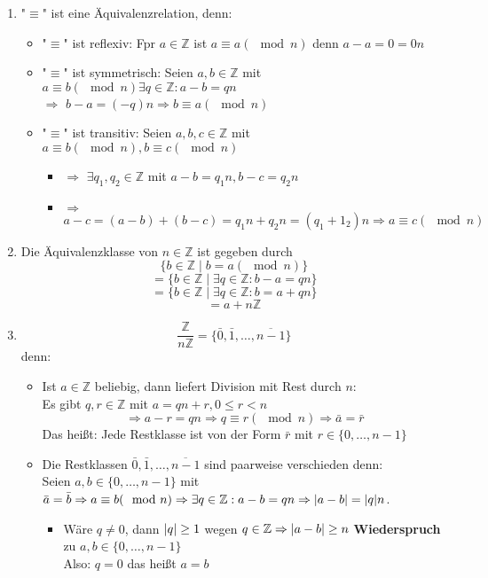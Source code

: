 \documentclass[a4paper]{scrartcl}
\DeclarePairedDelimiter\abs{\lvert}{\rvert}%
\begin{document}
\begin{enumerate}
\item "$\equiv$" ist eine Äquivalenzrelation, denn:
\begin{itemize}
\item "$\equiv$" ist reflexiv: Fpr $a\in\mathbb{Z}$ ist $a\equiv a(\mod n)$ denn $a - a = 0 = 0 n$
\item "$\equiv$" ist symmetrisch: Seien $a,b\in\mathbb{Z}$ mit $a\equiv b(\mod n) \exists q\in\mathbb{Z}:a - b = q n$ \\
           $\Rightarrow$ $b - a = (-q) n \Rightarrow b \equiv a(\mod n)$
\item "$\equiv$" ist transitiv: Seien $a,b,c\in\mathbb{Z}$ mit $a\equiv b(\mod n), b\equiv c(\mod n)$
\begin{itemize}
\item $\Rightarrow$ $\exists q_1,q_2 \in\mathbb{Z}$ mit $a - b = q_1 n, b - c = q_2 n$
\item $\Rightarrow$ $a - c = (a - b) + (b - c) = q_1 n + q_2 n = (q_1 + 1_2) n \Rightarrow a \equiv c(\mod n)$
\end{itemize}
\end{itemize}
\item Die Äquivalenzklasse von $n\in\mathbb{Z}$ ist gegeben durch
\[\{b\in\mathbb{Z} \mid b = a(\mod n)\}\]
\[= \{b\in\mathbb{Z} \mid \exists q\in\mathbb{Z}:b - a = qn\}\]
\[= \{b\in\mathbb{Z} \mid \exists q\in\mathbb{Z}:b = a + q n\}\]
\[= a + n\mathbb{Z} \]
\item \[\frac{\mathbb{Z}}{n\mathbb{Z}} = \{\bar 0, \bar 1, \ldots, \overline{n - 1}\}\]
         denn:
\begin{itemize}
\item Ist $a\in\mathbb{Z}$ beliebig, dann liefert Division mit Rest durch $n$: \\
           Es gibt $q,r\in\mathbb{Z}$ mit $a = q n + r,0\leq r < n$
           \[\Rightarrow a - r = q n \Rightarrow q \equiv r(\mod n) \Rightarrow \bar a = \bar r\]
           Das heißt: Jede Restklasse ist von der Form $\bar r$ mit $r\in \{0,\ldots,n - 1\}$ \\
\item Die Restklassen $\bar 0, \bar 1, \ldots, \overline{n - 1}$ sind paarweise verschieden denn: \\
           Seien $a,b\in\{0,\ldots,n - 1\}$ mit $\bar a = \bar b \Rightarrow a \equiv b(\mod n) \Rightarrow \exists q\in \mathbb{Z}: a - b = q n \Rightarrow \abs{a - b} = \abs{q} n$.
\begin{itemize}
\item Wäre $q\neq 0$, dann $\abs{q} \geq 1$ wegen $q\in\mathbb{Z} \Rightarrow \abs{a - b} \geq n$ \textbf{Wiederspruch} zu $a,b\in\{0,\ldots,n - 1\}$ \\
             Also: $q = 0$ das heißt $a = b$
\end{itemize}
\end{itemize}
\end{enumerate}
\end{document}
